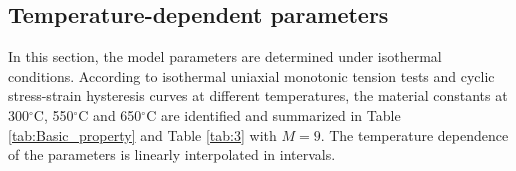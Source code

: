 \documentclass[preprint,5p,twocolumn,11pt,sort&compress]{elsarticle}
\begin{document}
\subsection{Temperature-dependent parameters}
\noindent
In this section, the model parameters are determined under isothermal conditions.
According to isothermal uniaxial monotonic tension tests and  cyclic stress-strain hysteresis curves at different temperatures, the material constants at 300$^{\circ}$C, 550$^{\circ}$C and 650$^{\circ}$C are identified and summarized in Table \ref{tab:Basic_property} and Table \ref{tab:3} with $M=9$. The temperature dependence of the parameters  is linearly interpolated in intervals.



\end{document}
